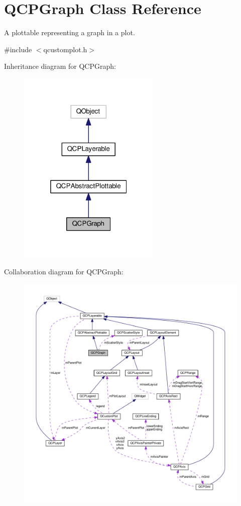 \hypertarget{classQCPGraph}{}\section{Q\+C\+P\+Graph Class Reference}
\label{classQCPGraph}


A plottable representing a graph in a plot.  




{\ttfamily \#include $<$qcustomplot.\+h$>$}



Inheritance diagram for Q\+C\+P\+Graph\+:
\nopagebreak
\begin{figure}[H]
\begin{center}
\leavevmode
\includegraphics[width=193pt]{classQCPGraph__inherit__graph}
\end{center}
\end{figure}


Collaboration diagram for Q\+C\+P\+Graph\+:
\nopagebreak
\begin{figure}[H]
\begin{center}
\leavevmode
\includegraphics[width=350pt]{classQCPGraph__coll__graph}
\end{center}
\end{figure}
